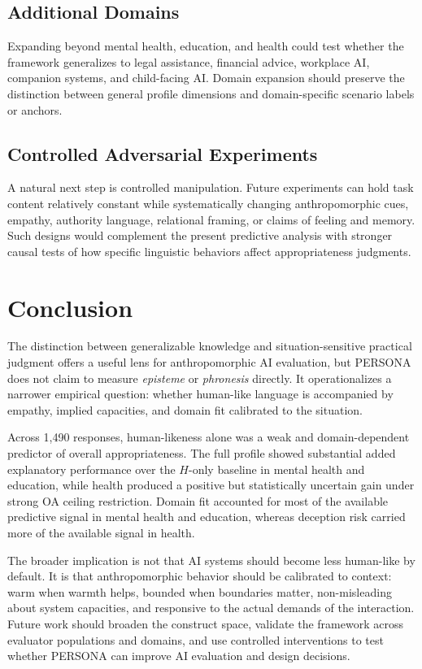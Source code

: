 \documentclass[manuscript,review,anonymous]{acmart}
\begin{document}
\subsection{Additional Domains}

Expanding beyond mental health, education, and health could test whether the framework generalizes to legal assistance, financial advice, workplace AI, companion systems, and child-facing AI. Domain expansion should preserve the distinction between general profile dimensions and domain-specific scenario labels or anchors.

\subsection{Controlled Adversarial Experiments}

A natural next step is controlled manipulation. Future experiments can hold task content relatively constant while systematically changing anthropomorphic cues, empathy, authority language, relational framing, or claims of feeling and memory. Such designs would complement the present predictive analysis with stronger causal tests of how specific linguistic behaviors affect appropriateness judgments.

\section{Conclusion}

The distinction between generalizable knowledge and situation-sensitive practical judgment offers a useful lens for anthropomorphic AI evaluation, but PERSONA does not claim to measure \textit{episteme} or \textit{phronesis} directly. It operationalizes a narrower empirical question: whether human-like language is accompanied by empathy, implied capacities, and domain fit calibrated to the situation.

Across 1,490 responses, human-likeness alone was a weak and domain-dependent predictor of overall appropriateness. The full profile showed substantial added explanatory performance over the $H$-only baseline in mental health and education, while health produced a positive but statistically uncertain gain under strong OA ceiling restriction. Domain fit accounted for most of the available predictive signal in mental health and education, whereas deception risk carried more of the available signal in health.

The broader implication is not that AI systems should become less human-like by default. It is that anthropomorphic behavior should be calibrated to context: warm when warmth helps, bounded when boundaries matter, non-misleading about system capacities, and responsive to the actual demands of the interaction. Future work should broaden the construct space, validate the framework across evaluator populations and domains, and use controlled interventions to test whether PERSONA can improve AI evaluation and design decisions.
\end{document}
